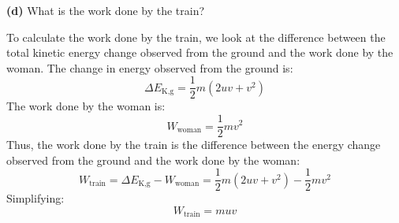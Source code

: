 \documentclass[12pt]{article}
\begin{document}
\textbf{(d)} What is the work done by the train?

To calculate the work done by the train, we look at the difference between the total kinetic energy change observed from the ground and the work done by the woman. The change in energy observed from the ground is:
\[
\Delta E_{\text{K,g}} = \frac{1}{2}m(2uv + v^2)
\]
The work done by the woman is:
\[
W_{\text{woman}} = \frac{1}{2}mv^2
\]
Thus, the work done by the train is the difference between the energy change observed from the ground and the work done by the woman:
\[
W_{\text{train}} = \Delta E_{\text{K,g}} - W_{\text{woman}} = \frac{1}{2}m(2uv + v^2) - \frac{1}{2}mv^2
\]
Simplifying:
\[
W_{\text{train}} = muv
\]
\end{document}
